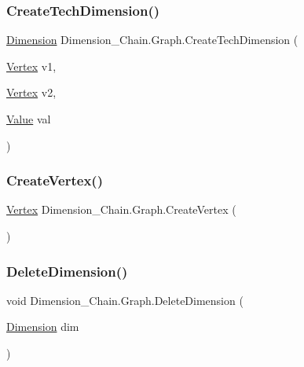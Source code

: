 \subsubsection{\texorpdfstring{Create\+Tech\+Dimension()}{CreateTechDimension()}}
{\footnotesize\ttfamily \mbox{\hyperlink{class_dimension___chain_1_1_dimension}{Dimension}} Dimension\+\_\+\+Chain.\+Graph.\+Create\+Tech\+Dimension (\begin{DoxyParamCaption}\item[{\mbox{\hyperlink{class_dimension___chain_1_1_vertex}{Vertex}}}]{v1,  }\item[{\mbox{\hyperlink{class_dimension___chain_1_1_vertex}{Vertex}}}]{v2,  }\item[{\mbox{\hyperlink{class_dimension___chain_1_1_value}{Value}}}]{val }\end{DoxyParamCaption})}

\mbox{\label{class_dimension___chain_1_1_graph_ac175fc4299e2577a99d7b6c197bae4d2}} 
\subsubsection{\texorpdfstring{Create\+Vertex()}{CreateVertex()}}
{\footnotesize\ttfamily \mbox{\hyperlink{class_dimension___chain_1_1_vertex}{Vertex}} Dimension\+\_\+\+Chain.\+Graph.\+Create\+Vertex (\begin{DoxyParamCaption}{ }\end{DoxyParamCaption})}

\mbox{\label{class_dimension___chain_1_1_graph_a781ea9fd0f61ebf19698b1964b7a9f15}} 
\subsubsection{\texorpdfstring{Delete\+Dimension()}{DeleteDimension()}}
{\footnotesize\ttfamily void Dimension\+\_\+\+Chain.\+Graph.\+Delete\+Dimension (\begin{DoxyParamCaption}\item[{\mbox{\hyperlink{class_dimension___chain_1_1_dimension}{Dimension}}}]{dim }\end{DoxyParamCaption})}



